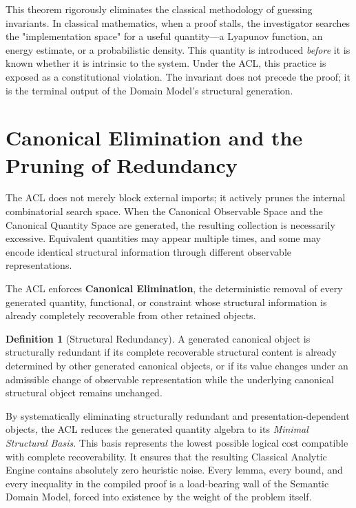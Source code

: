 \documentclass[12pt,openany]{extbook}
\theoremstyle{plain}
\theoremstyle{definition}
\newtheorem{definition}{Definition}[chapter]
\begin{document}
This theorem rigorously eliminates the classical methodology of guessing invariants. In classical mathematics, when a proof stalls, the investigator searches the "implementation space" for a useful quantity—a Lyapunov function, an energy estimate, or a probabilistic density. This quantity is introduced \emph{before} it is known whether it is intrinsic to the system. Under the ACL, this practice is exposed as a constitutional violation. The invariant does not precede the proof; it is the terminal output of the Domain Model's structural generation.

\section{Canonical Elimination and the Pruning of Redundancy}

The ACL does not merely block external imports; it actively prunes the internal combinatorial search space. When the Canonical Observable Space and the Canonical Quantity Space are generated, the resulting collection is necessarily excessive. Equivalent quantities may appear multiple times, and some may encode identical structural information through different observable representations.

The ACL enforces \textbf{Canonical Elimination}, the deterministic removal of every generated quantity, functional, or constraint whose structural information is already completely recoverable from other retained objects. 

\begin{definition}[Structural Redundancy]
A generated canonical object is structurally redundant if its complete recoverable structural content is already determined by other generated canonical objects, or if its value changes under an admissible change of observable representation while the underlying canonical structural object remains unchanged.
\end{definition}

By systematically eliminating structurally redundant and presentation-dependent objects, the ACL reduces the generated quantity algebra to its \emph{Minimal Structural Basis}. This basis represents the lowest possible logical cost compatible with complete recoverability. It ensures that the resulting Classical Analytic Engine contains absolutely zero heuristic noise. Every lemma, every bound, and every inequality in the compiled proof is a load-bearing wall of the Semantic Domain Model, forced into existence by the weight of the problem itself.
\end{document}
